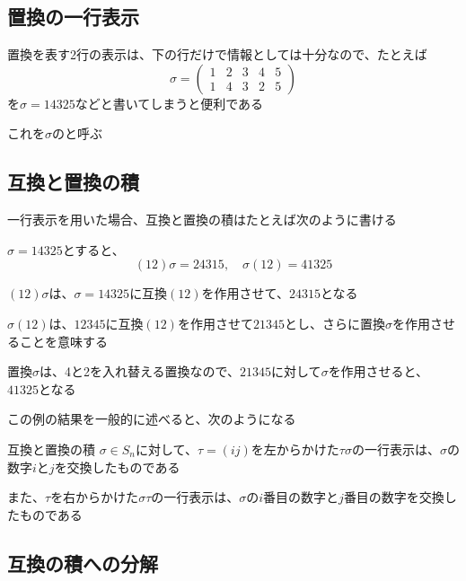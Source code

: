 \documentclass[../../../topic_linear-algebra]{subfiles}
\begin{document}
\subsection{置換の一行表示}

置換を表す2行の表示は、下の行だけで情報としては十分なので、たとえば
\begin{equation*}
  \sigma = \begin{pmatrix}
    1 & 2 & 3 & 4 & 5 \\
    1 & 4 & 3 & 2 & 5
  \end{pmatrix}
\end{equation*}
を$\sigma = 14325$などと書いてしまうと便利である

これを$\sigma$のと呼ぶ

\subsection{互換と置換の積}

一行表示を用いた場合、互換と置換の積はたとえば次のように書ける

$\sigma = 14325$とすると、
\begin{equation*}
  (12)\sigma = 24315,\quad \sigma(12) = 41325
\end{equation*}

$(12)\sigma$は、$\sigma = 14325$に互換$(12)$を作用させて、$24315$となる

\br

$\sigma(12)$は、$12345$に互換$(12)$を作用させて$21345$とし、さらに置換$\sigma$を作用させることを意味する

置換$\sigma$は、4と2を入れ替える置換なので、$21345$に対して$\sigma$を作用させると、$41325$となる

\br

この例の結果を一般的に述べると、次のようになる

\begin{theorem*}{互換と置換の積}
  $\sigma \in S_n$に対して、$\tau = (ij)$を左からかけた$\tau\sigma$の一行表示は、$\sigma$の数字$i$と$j$を交換したものである

  また、$\tau$を右からかけた$\sigma\tau$の一行表示は、$\sigma$の$i$番目の数字と$j$番目の数字を交換したものである
\end{theorem*}

\subsection{互換の積への分解}
\end{document}
